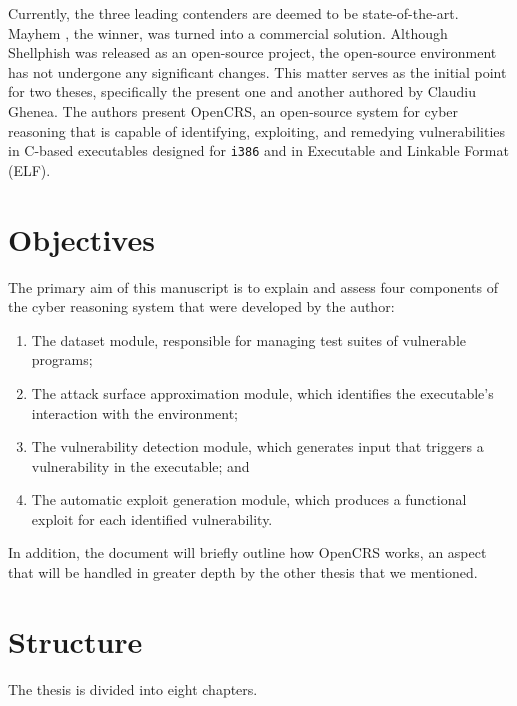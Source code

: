 \documentclass[../main.tex]{subfiles}
\begin{document}
Currently, the three leading contenders are deemed to be state-of-the-art.
Mayhem \cite{mayhem}, the winner, was turned into a commercial solution.
Although Shellphish \cite{shellphish} was released as an open-source project,
the open-source environment has not undergone any significant changes. This
matter serves as the initial point for two theses, specifically the present one
and another \cite{ghenea} authored by Claudiu Ghenea. The authors present
OpenCRS, an open-source system for cyber reasoning that is capable of
identifying, exploiting, and remedying vulnerabilities in C-based executables
designed for \texttt{i386} and in Executable and Linkable Format (ELF).

\hypertarget{objectives}{%
  \section{Objectives}\label{objectives}}

The primary aim of this manuscript is to explain and assess four components of
the cyber reasoning system that were developed by the author:

\begin{enumerate}
  \def\labelenumi{\arabic{enumi}.}
  \tightlist
  \item
        The dataset module, responsible for managing test suites of vulnerable
        programs;
  \item
        The attack surface approximation module, which identifies the
        executable's interaction with the environment;
  \item
        The vulnerability detection module, which generates input that
        triggers a vulnerability in the executable; and
  \item
        The automatic exploit generation module, which produces a functional
        exploit for each identified vulnerability.
\end{enumerate}

In addition, the document will briefly outline how OpenCRS works, an aspect
that will be handled in greater depth by the other thesis that we mentioned.

\hypertarget{structure}{%
  \section{Structure}\label{structure}}

The thesis is divided into eight chapters.
\end{document}
